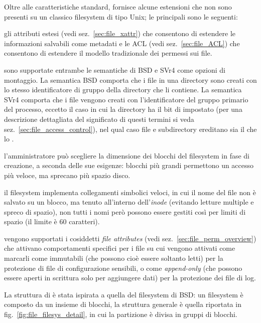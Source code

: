 Oltre alle caratteristiche standard,  fornisce alcune estensioni che
non sono presenti su un classico filesystem di tipo Unix; le principali sono
le seguenti:
\begin{itemize*}
\item gli attributi estesi (vedi sez.~\ref{sec:file_xattr}) che consentono di
  estendere le informazioni salvabili come metadati e le ACL (vedi
  sez.~\ref{sec:file_ACL}) che consentono di estendere il modello tradizionale
  dei permessi sui file.
\item sono supportate entrambe le semantiche di BSD e SVr4 come opzioni di
  montaggio. La semantica BSD comporta che i file in una directory sono creati
  con lo stesso identificatore di gruppo della directory che li contiene. La
  semantica SVr4 comporta che i file vengono creati con l'identificatore del
  gruppo primario del processo, eccetto il caso in cui la directory ha il bit
  di  impostato (per una descrizione dettagliata del significato di
  questi termini si veda sez.~\ref{sec:file_access_control}), nel qual caso
  file e subdirectory ereditano sia il  che lo .
\item l'amministratore può scegliere la dimensione dei blocchi del filesystem
  in fase di creazione, a seconda delle sue esigenze: blocchi più grandi
  permettono un accesso più veloce, ma sprecano più spazio disco.
\item il filesystem implementa collegamenti simbolici veloci, in cui il nome
  del file non è salvato su un blocco, ma tenuto all'interno
  dell'\textit{inode} (evitando letture multiple e spreco di spazio), non
  tutti i nomi però possono essere gestiti così per limiti di spazio (il
  limite è 60 caratteri).
\item vengono supportati i cosiddetti \textit{file attributes} (vedi
  sez.~\ref{sec:file_perm_overview}) che attivano comportamenti specifici per
  i file su cui vengono attivati come marcarli come immutabili (che possono
  cioè essere soltanto letti) per la protezione di file di configurazione
  sensibili, o come \textit{append-only} (che possono essere aperti in
  scrittura solo per aggiungere dati) per la protezione dei file di log.
\end{itemize*}

La struttura di  è stata ispirata a quella del filesystem di BSD: un
filesystem è composto da un insieme di blocchi, la struttura generale è quella
riportata in fig.~\ref{fig:file_filesys_detail}, in cui la partizione è divisa
in gruppi di blocchi.

